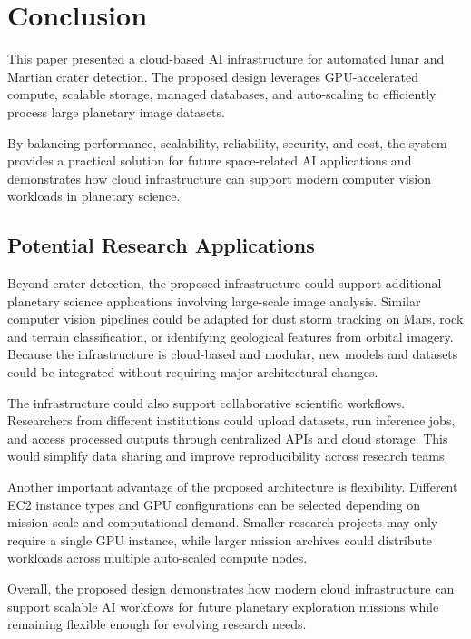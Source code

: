 \documentclass[conference]{IEEEtran}
\begin{document}
	\section{Conclusion}
	
	This paper presented a cloud-based AI infrastructure for automated lunar and Martian crater detection. The proposed design leverages GPU-accelerated compute, scalable storage, managed databases, and auto-scaling to efficiently process large planetary image datasets.
	
	By balancing performance, scalability, reliability, security, and cost, the system provides a practical solution for future space-related AI applications and demonstrates how cloud infrastructure can support modern computer vision workloads in planetary science.
	
	\subsection{Potential Research Applications}
	
	Beyond crater detection, the proposed infrastructure could support additional planetary science applications involving large-scale image analysis. Similar computer vision pipelines could be adapted for dust storm tracking on Mars, rock and terrain classification, or identifying geological features from orbital imagery. Because the infrastructure is cloud-based and modular, new models and datasets could be integrated without requiring major architectural changes.
	
	The infrastructure could also support collaborative scientific workflows. Researchers from different institutions could upload datasets, run inference jobs, and access processed outputs through centralized APIs and cloud storage. This would simplify data sharing and improve reproducibility across research teams.
	
	Another important advantage of the proposed architecture is flexibility. Different EC2 instance types and GPU configurations can be selected depending on mission scale and computational demand. Smaller research projects may only require a single GPU instance, while larger mission archives could distribute workloads across multiple auto-scaled compute nodes.
	
	Overall, the proposed design demonstrates how modern cloud infrastructure can support scalable AI workflows for future planetary exploration missions while remaining flexible enough for evolving research needs.
	
\end{document}
